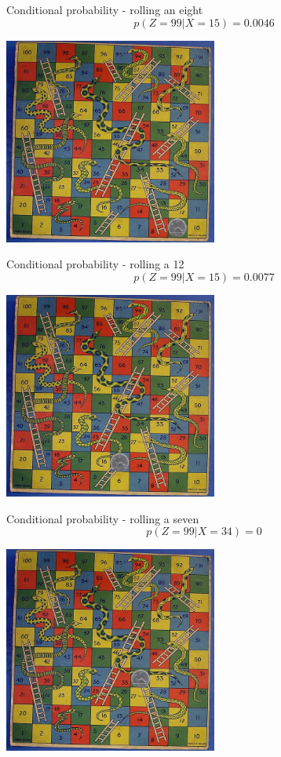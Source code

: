 \documentclass{beamer}
\newcommand{\crish}{\color{reddish}}
\newcommand{\cbla}{\color{black}}
\begin{document}
\begin{frame}{Conditional probability - rolling an eight}
    \crish $$ p(Z=99|X=15)=0.0046 $$ \cbla
  \begin{center}
    \includegraphics[width=7cm]{game9.jpg}
  \end{center}
\end{frame}


\begin{frame}{Conditional probability - rolling a 12}
    \crish $$ p(Z=99|X=15)=0.0077 $$ \cbla
  \begin{center}
    \includegraphics[width=7cm]{game15.jpg}
  \end{center}
\end{frame}

\begin{frame}{Conditional probability - rolling a seven}
    \crish $$ p(Z=99|X=34)=0 $$ \cbla
  \begin{center}
    \includegraphics[width=7cm]{game34.jpg}
  \end{center}
\end{frame}
\end{document}
